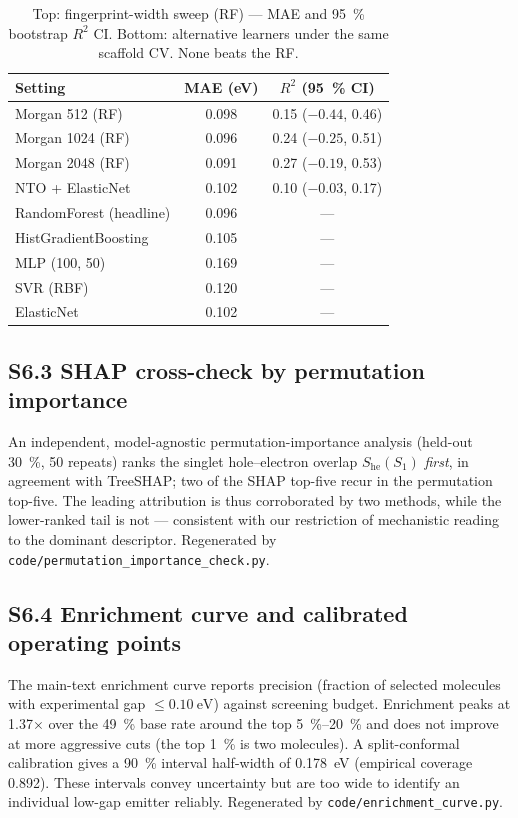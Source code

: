 \documentclass[final,3p,times,twocolumn]{elsarticle}
\begin{document}
\begin{table}[htbp]
  \centering
  \caption{Top: fingerprint-width sweep (RF) — MAE and \qty{95}{\percent} bootstrap $R^2$
    CI. Bottom: alternative learners under the same scaffold CV. None beats the RF.}
  \label{tab:capacity}
  \footnotesize
  \begin{tabular}{lcc}
    \toprule
    Setting & MAE (eV) & $R^2$ (\qty{95}{\percent} CI) \\
    \midrule
    Morgan 512 (RF)   & 0.098 & 0.15 ($-0.44$, 0.46) \\
    Morgan 1024 (RF)  & 0.096 & 0.24 ($-0.25$, 0.51) \\
    Morgan 2048 (RF)  & 0.091 & 0.27 ($-0.19$, 0.53) \\
    NTO + ElasticNet  & 0.102 & 0.10 ($-0.03$, 0.17) \\
    \midrule
    RandomForest (headline) & 0.096 & --- \\
    HistGradientBoosting    & 0.105 & --- \\
    MLP (100, 50)           & 0.169 & --- \\
    SVR (RBF)               & 0.120 & --- \\
    ElasticNet              & 0.102 & --- \\
    \bottomrule
  \end{tabular}
\end{table}

\subsection*{S6.3 SHAP cross-check by permutation importance}
An independent, model-agnostic permutation-importance analysis (held-out \qty{30}{\percent},
\num{50} repeats) ranks the singlet hole--electron overlap $S_\text{he}(S_1)$ \emph{first},
in agreement with TreeSHAP; two of the SHAP top-five recur in the permutation top-five. The
leading attribution is thus corroborated by two methods, while the lower-ranked tail is not
--- consistent with our restriction of mechanistic reading to the dominant descriptor.
Regenerated by \texttt{code/permutation\_importance\_check.py}.

\subsection*{S6.4 Enrichment curve and calibrated operating points}
The main-text enrichment curve reports precision (fraction of selected molecules with experimental
gap $\le\qty{0.10}{\electronvolt}$) against screening budget. Enrichment peaks at
\num{1.37}$\times$ over the \qty{49}{\percent} base rate around the top \qtyrange{5}{20}{\percent}
and does not improve at more aggressive cuts (the top \qty{1}{\percent} is two molecules). A
split-conformal calibration gives a \qty{90}{\percent} interval half-width of
\qty{0.178}{\electronvolt} (empirical coverage \num{0.892}). These
intervals convey uncertainty but are too wide to identify an individual
low-gap emitter reliably. Regenerated by \texttt{code/enrichment\_curve.py}.
\end{document}
